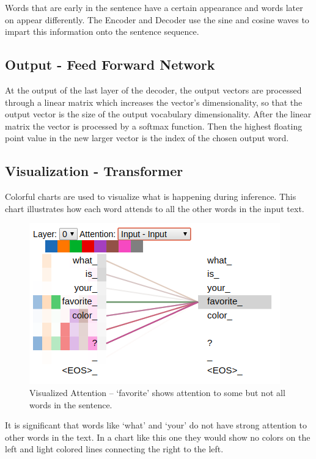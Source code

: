 Words that are early in the sentence have a certain appearance and words later on appear differently. The Encoder and Decoder use the sine and cosine waves to impart this information onto the sentence sequence. 

\subsection{Output - Feed Forward Network}
At the output of the last layer of the decoder, the output vectors are processed through a linear matrix which increases the vector's dimensionality, so that the output vector is the size of the output vocabulary dimensionality. After the linear matrix the vector is processed by a softmax function. Then the highest floating point value in the new larger vector is the index of the chosen output word.


\subsection{Visualization - Transformer}

Colorful charts are used to visualize what is happening during inference. This chart illustrates how each word attends to all the other words in the input text.

\begin{figure}[H]
	\begin{center}
		\includegraphics[scale=2]{Figure_3}
		
		
	\end{center}
	\caption[Visualized Attention Transformer]{Visualized Attention -- `favorite' shows attention to some but not all words in the sentence.}
	
	
\end{figure}

It is significant that words like `what' and `your' do not have strong attention to other words in the text. In a chart like this one they would show no colors on the left and light colored lines connecting the right to the left.

